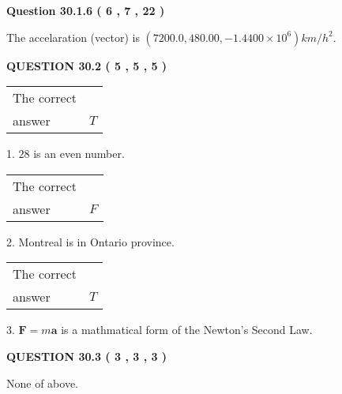 \documentclass[12pt]{article}
\begin{document}
{\textbf{\Large{Question
30.1.6 
 (           6 ,           7 ,          22 )
}}}
  
  
 
 
\noindent{}
 
 
The accelaration (vector) is
$(
7200.0,
480.00 ,
-1.4400 \times 10^{6}
)km/h^2.
$
 
 
 
 
  
\vspace{0.2in}
  
{\textbf{\Large{QUESTION
30.2 
 (           5 ,           5 ,           5 )
}}}
  
  
 
 
\noindent{}

 
\noindent\begin{tabular}{|l|l|}\hline The correct & \\
          answer &  %
$T$ \\ \hline \end{tabular}
1. $ %
28$ is an  %
even number.
 
\noindent\begin{tabular}{|l|l|}\hline The correct & \\
          answer &  %
$F$ \\ \hline \end{tabular}
2.  %
Montreal is in  %
Ontario province.
 
\noindent\begin{tabular}{|l|l|}\hline The correct & \\
          answer &  %
$T$ \\ \hline \end{tabular}
3.  %
$\mathbf{F}=m\mathbf{a}$ is a mathmatical form of  %
the Newton's Second Law.
 
 
 
  
\vspace{0.2in}
  
{\textbf{\Large{QUESTION
30.3 
 (           3 ,           3 ,           3 )
}}}
  
  
 
 
\noindent{}
 
 
 None of above.
 
 
 
\end{document}
